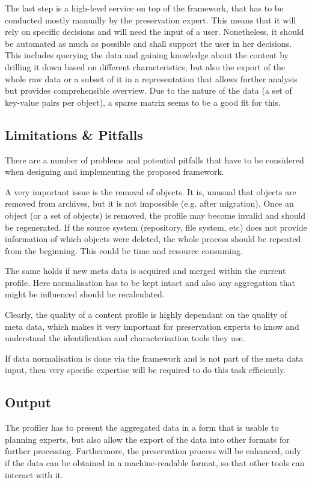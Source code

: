 The last step is a high-level service on top of the framework, that has to be conducted mostly manually by the preservation expert. This means that it will rely on specific decisions and will need the input of a user. Nonetheless, it should be automated as much as possible and shall support the user in her decisions. This includes querying the data and gaining knowledge about the content by drilling it down based on different characteristics, but also the export of the whole raw data or a subset of it in a representation that allows further analysis but provides comprehensible overview.
Due to the nature of the data (a set of key-value pairs per object), a sparse matrix seems to be a good fit for this.

\subsection{Limitations \& Pitfalls}
There are a number of problems and potential pitfalls that have to be considered when designing and implementing the proposed framework.

A very important issue is the removal of objects. It is, unusual that objects are removed from archives, but it is not impossible (e.g. after migration). Once an object (or a set of objects) is removed, the profile may become invalid and should be regenerated. If the source system (repository, file system, etc) does not provide information of which objects were deleted, the whole process should be repeated from the beginning. This could be time and resource consuming.

The same holds if new meta data is acquired and merged within the current profile. Here normalisation has to be kept intact and also any aggregation that might be influenced should be recalculated.

Clearly, the quality of a content profile is highly dependant on the quality of meta data, which makes it very important for preservation experts to know and understand the identification and characterisation tools they use.

If data normalisation is done via the framework and is not part of the meta data input, then very specific expertise will be required to do this task efficiently.

\subsection{Output}
The profiler has to present the aggregated data in a form that is usable to planning experts, but also allow the export of the data into other formats for further processing. Furthermore, the preservation process will be enhanced, only if the data
can be obtained in a machine-readable format, so that other tools can interact with it.

